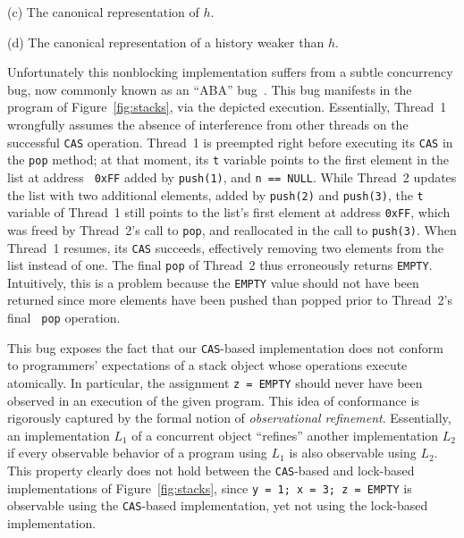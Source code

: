 \begin{figure*}[t]
\begin{minipage}[c]{120mm}
    \smallskip
    \hspace{5cm}(c) The canonical representation of $h$.
        
    \smallskip
    
    
    \smallskip
    \hspace{5cm}(d) The canonical representation of a history weaker than $h$.
  \end{minipage}
  \caption{Two implementations of a concurrent stack object, a stack-using
  program, and an execution using Treiber's stack. The {\tt pop} operation
  returns the {\tt EMPTY} when the stack is empty. The execution depicts calls,
  returns, and assignments, and time progresses downward.}
  \label{fig:stacks}
\end{figure*}

Unfortunately this nonblocking implementation suffers from a subtle concurrency
bug, now commonly known as an ``ABA'' bug~\cite{tr/ibm/Michael04}. This bug
manifests in the program of Figure~\ref{fig:stacks}, via the depicted
execution. Essentially, Thread~1 wrongfully assumes the absence of interference
from other threads on the successful {\tt CAS} operation. Thread~1 is preempted
right before executing its {\tt CAS} in the {\tt pop} method; at that moment,
its {\tt t} variable points to the first element in the list at address {\tt
0xFF} added by {\tt push(1)}, and {\tt n == NULL}. While Thread~2 updates the
list with two additional elements, added by {\tt push(2)} and {\tt push(3)},
the {\tt t} variable of Thread~1 still points to the list's first element at
address {\tt 0xFF}, which was freed by Thread~2's call to {\tt pop}, and
reallocated in the call to {\tt push(3)}. When Thread~1 resumes, its {\tt CAS}
succeeds, effectively removing two elements from the list instead of one. The
final {\tt pop} of Thread~2 thus erroneously returns {\tt EMPTY}. Intuitively,
this is a problem because the {\tt EMPTY} value should not have been returned
since more elements have been pushed than popped prior to Thread~2's final {\tt
pop} operation.

This bug exposes the fact that our {\tt CAS}-based implementation does not
conform to programmers' expectations of a stack object whose operations execute
atomically. In particular, the assignment {\tt z = EMPTY} should never have
been observed in an execution of the given program. This idea of conformance is
rigorously captured by the formal notion of \emph{observational refinement}.
Essentially, an implementation $L_1$ of a concurrent object ``refines'' another
implementation $L_2$ if every observable behavior of a program using $L_1$ is
also observable using $L_2$. This property clearly does not hold between the
{\tt CAS}-based and lock-based implementations of Figure~\ref{fig:stacks},
since {\tt y = 1; x = 3; z = EMPTY} is observable using the {\tt CAS}-based
implementation, yet not using the lock-based implementation.
